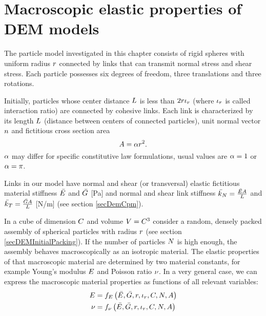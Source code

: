 \chapter{Macroscopic elastic properties of DEM models}\label{chapMacroproperties}

The particle model investigated in this chapter consists of rigid spheres with uniform radius $r$ connected by links that can transmit normal stress and shear stress.
Each particle possesses six degrees of freedom, three translations and three rotations.

Initially, particles whose center distance $L$ is less than $2r\iota_r$ (where $\iota_r$ is called interaction ratio) are connected by cohesive links.
Each link is characterized by its
length $L$ (distance between centers of connected particles),
unit normal vector $n$
and
fictitious cross section area
\begin{equation}
	A = \alpha r^2
	.
	\label{eqMacroPropertiesElasticLinkCSArea}
\end{equation}
$\alpha$ may differ for specific constitutive law formulations, usual values are $\alpha=1$ or $\alpha=\pi$.

Links in our model have normal and shear (or transversal) elastic fictitious material
stiffness
$\linkMaterialStiffnessNormal$
and
$\linkMaterialStiffnessShear$
[Pa] and normal and shear link stiffness
$\linkStiffnessNormal = \frac{\linkMaterialStiffnessNormal\linkCrossSectionArea}{\linkLength}$
and
$\linkStiffnessShear = \frac{\linkMaterialStiffnessShear\linkCrossSectionArea}{\linkLength}$
[N/m] (see section \ref{secDemCpm}).

In a cube of dimension $C$ and volume $V=C^3$ consider a random, densely packed assembly of spherical particles with radius $r$ (see section \ref{secDEMInitialPacking}).
If the number of particles $N$ is high enough, the assembly behaves macroscopically as an isotropic material.
The elastic properties of that macroscopic material are determined by two material constants, for example Young's modulus $E$ and Poisson ratio $\nu$.
In a very general case, we can express the macroscopic material properties as functions of all relevant variables:
\begin{align}
	\youngModulus &= f_\youngModulus \left(
		\linkMaterialStiffnessNormal,
		\linkMaterialStiffnessShear,
		\radius,
		\interactionRatio,
		\cubeDimension,
		\numberOfParticles,
		\linkCrossSectionArea
	\right)
	\label{eqMacroPropertiesElasticGeneralYoung}
	\\
	\poissonRatio &= f_\poissonRatio \left(
		\linkMaterialStiffnessNormal,
		\linkMaterialStiffnessShear,
		\radius,
		\interactionRatio,
		\cubeDimension,
		\numberOfParticles,
		\linkCrossSectionArea
	\right)
	\label{eqMacroPropertiesElasticGeneralPoisson}
\end{align}

